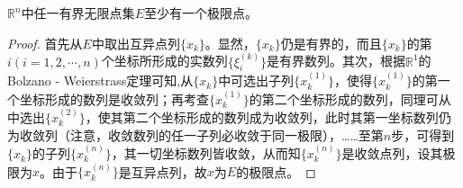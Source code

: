 \documentclass[../../main.tex]{subfiles}
\begin{document}
\begin{theorem}\label{theorem:Bolzano - Weierstrass定理}
\(\mathbb{R}^n\)中任一有界无限点集\(E\)至少有一个极限点。
\end{theorem}
\begin{proof}
首先从\(E\)中取出互异点列\(\{x_k\}\)。显然，\(\{x_k\}\)仍是有界的，而且\(\{x_k\}\)的第\(i(i = 1,2,\cdots,n)\)个坐标所形成的实数列\(\{\xi_i^{(k)}\}\)是有界数列。其次，根据\(\mathbb{R}^1\)的Bolzano - Weierstrass定理可知,从\(\{x_k\}\)中可选出子列\(\{x_k^{(1)}\}\)，使得\(\{x_k^{(1)}\}\)的第一个坐标形成的数列是收敛列；再考查\(\{x_k^{(1)}\}\)的第二个坐标形成的数列，同理可从中选出\(\{x_k^{(2)}\}\)，使其第二个坐标形成的数列成为收敛列，此时其第一坐标数列仍为收敛列（注意，收敛数列的任一子列必收敛于同一极限），……至第\(n\)步，可得到\(\{x_k\}\)的子列\(\{x_k^{(n)}\}\)，其一切坐标数列皆收敛，从而知\(\{x_k^{(n)}\}\)是收敛点列，设其极限为\(x\)。由于\(\{x_k^{(n)}\}\)是互异点列，故\(x\)为\(E\)的极限点。
\end{proof}
\end{document}
